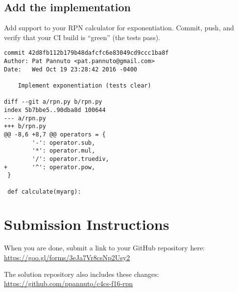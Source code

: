 \documentclass{article}
\begin{document}
\subsection{Add the implementation}
Add support to your RPN calculator for exponentiation. Commit, push,
and verify that your CI build is ``green'' (the tests pass).

{\color{violet}
\begin{lstlisting}
commit 42d8fb112b179b48dafcfc6e83049cd9ccc1ba8f
Author: Pat Pannuto <pat.pannuto@gmail.com>
Date:   Wed Oct 19 23:28:42 2016 -0400

    Implement exponentiation (tests clear)

diff --git a/rpn.py b/rpn.py
index 5b7bbe5..90dba8d 100644
--- a/rpn.py
+++ b/rpn.py
@@ -8,6 +8,7 @@ operators = {
        '-': operator.sub,
        '*': operator.mul,
        '/': operator.truediv,
+       '^': operator.pow,
 }

 def calculate(myarg):
\end{lstlisting}
}

\section*{Submission Instructions}
When you are done, submit a link to your GitHub repository here: \url{https://goo.gl/forms/3eJa7Vr8csNp2Usy2}

{\color{violet}
  The solution repository also includes these changes:
  \url{https://github.com/ppannuto/c4cs-f16-rpn}
}
\end{document}
